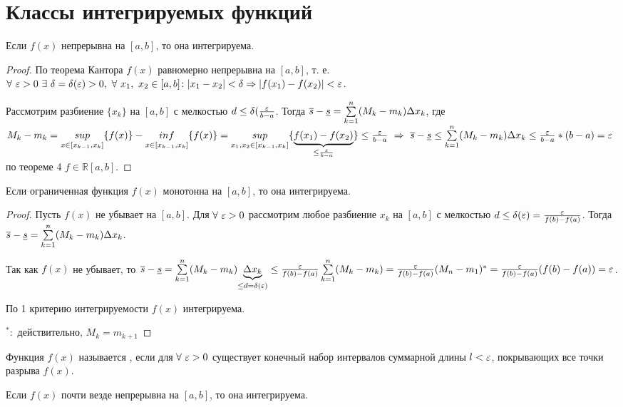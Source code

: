 \section{Классы интегрируемых функций}
\begin{theor}
Если $f(x)$ непрерывна на $[a,b]$, то она интегрируема.
\end{theor}
\begin{proof}
По теорема Кантора $f(x)$ равномерно непрерывна на $[a,b]$, т. е. $\forall\ \eps>0\ \exists\ \delta=\delta(\eps)>0,\ \forall\ x_1,\ x_2\in[a,b]\colon|x_1-x_2|<\delta\Rightarrow|f(x_1)-f(x_2)|<\eps$.

Рассмотрим разбиение $\{x_k\}$ на $[a,b]$ с мелкостью $d\leq\delta(\frac{\varepsilon}{b-a}$. Тогда $\overline{s}-\underline{s}=\sum\limits^n_{k=1}(M_k-m_k)\Delta x_k$, где $M_k-m_k=\underset{x\in[x_{k-1},x_k]}{sup}\{f(x)\}-\underset{x\in[x_{k-1},x_k]}{inf}\{f(x)\}=\underset{x_1,x_2\in[x_{k-1},x_k]}{sup}\{\underset{\leq\frac\eps{b-a}}{\underbrace{f(x_1)-f(x_2)}}\}\leq\frac\eps{b-a}\ \Rightarrow\ \vs-\ns\leq\sum\limits^n_{k=1}(M_k-m_k)\Delta x_k\leq\frac\eps{b-a}*(b-a)=\eps$ \then по теореме 4 $f\in\mathbb{R}[a,b]$.
\end{proof}
\begin{theor}
Если ограниченная функция $f(x)$ монотонна на $[a,b]$, то она интегрируема.
\end{theor}
\begin{proof}
Пусть $f(x)$ не убывает на $[a,b]$. Для $\forall\ \eps>0$ рассмотрим любое разбиение ${x_k}$ на $[a,b]$ с мелкостью $d\leq\delta(\varepsilon)=\frac{\varepsilon}{f(b)-f(a)}$. Тогда $\overline{s}-\underline{s}=\sum\limits_{k=1}^n(M_k-m_k)\Delta x_k$.

Так как $f(x)$ не убывает, то $\overline{s}-\underline{s}=\sum\limits^n_{k=1}(M_k-m_k)\underset{\leq d=\delta(\varepsilon)}{\underbrace{\Delta x_k}}\leq\frac{\varepsilon}{f(b)-f(a)}\sum\limits^n_{k=1}(M_k-m_k)=\frac{\varepsilon}{f(b)-f(a)}(M_n-m_1)^*=\frac{\varepsilon}{f(b)-f(a)}(f(b)-f(a))=\varepsilon$.

По 1 критерию интегрируемости $f(x)$ интегрируема.

${}^*\colon$ действительно, $M_k=m_{k+1}$
\end{proof}
\begin{opred}
Функция $f(x)$ называется , если для $\forall\ \eps>0$ существует конечный набор интервалов суммарной длины $l<\varepsilon$, покрывающих все точки разрыва $f(x)$.
\end{opred}
\begin{theor}
Если $f(x)$ почти везде непрерывна на $[a,b]$, то она интегрируема.
\end{theor}

